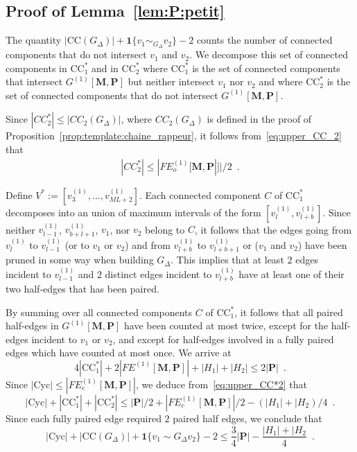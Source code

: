 \documentclass{article}
\begin{document}
\subsection{Proof of Lemma~\ref{lem:P:petit}}


The quantity $|\mathrm{CC}(G_{\Delta})|+ \mathbf{1}\{v_1\sim_{G_{\Delta}} v_2\} -2$ counts the number of connected components that do not intersect $v_1$ and $v_2$. We decompose this set of connected components in $\mathrm{CC}^*_{1}$ and in  $\mathrm{CC}^*_2$ where $\mathrm{CC}^*_{1}$ is the set of connected components that intersect $G^{(1)}[\mathbf{M},\mathbf{P}]$ but neither intersect  $v_1$ nor $v_2$ and where $\mathrm{CC}^*_2$ is the set of connected components that do not intersect $G^{(1)}[\mathbf{M},\mathbf{P}]$. 

Since $|CC^*_2|\leq |CC_2(G_{\Delta})|$, where $CC_2(G_{\Delta})$ is defined in the proof of Proposition~\ref{prop:template:chaine_rappeur}, it follows from~\eqref{eq:upper_CC_2} that  
\begin{align}\label{eq:upper_CC*2}
|CC^*_2|\leq |FE^{(1)}_o[\mathbf{M},\mathbf{P}|]|/2\enspace .
\end{align}

Define $V^*:=[v_3^{(1)},\ldots, v_{ML+2}^{(1)}]$. Each connected component $C$ of  $\mathrm{CC}^*_{1}$ decomposes into an union of maximum intervals of the form $[v^{(1)}_l, v^{(1)}_{l+b}]$. Since neither $v_{l-1}^{(1)}$, $v_{b+l+1}^{(1)}$, $v_1$, nor $v_2$ belong to $C$, it follows that the edges going from $v_{l}^{(1)}$ to $v^{(1)}_{l-1}$ (or to $v_1$ or $v_2$) and from $v^{(1)}_{l+b}$ to $v^{(1)}_{l+b+1}$ or ($v_1$ and $v_2$) have been pruned in some way when building $G_{\Delta}$. This implies that at least $2$ edges incident to $v_{l-1}^{(1)}$ and $2$ distinct edges incident to $v^{(1)}_{l+b}$ have at least one of their two half-edges that has been paired.  

By summing over all connected components $C$ of $\mathrm{CC}^*_{1}$, it follows that all paired half-edges in $G^{(1)}[\mathbf{M},\mathbf{P}]$ have been  counted at most twice, except for the half-edges incident to $v_1$ or $v_2$, and except for half-edges involved in a fully paired edges which have counted at most once. 
We arrive at  
\[
4 |\mathrm{CC}^*_1|+ 2 |FE^{(1)}[\mathbf{M},\mathbf{P}]|+ |H_1|+|H_2| \leq 2|\mathbf{P}|\enspace . 
\]
Since $|\mathrm{Cyc}|\leq |FE^{(1)}_{c}[\mathbf{M},\mathbf{P}]|$, we deduce from~\eqref{eq:upper_CC*2}  that 
\[
|\mathrm{Cyc}| +  |\mathrm{CC}^*_1|+  |\mathrm{CC}^*_2| \leq |\mathbf{P}|/2 + |FE^{(1)}_{c}[\mathbf{M},\mathbf{P}]|/2 - (|H_1|+|H_2)/4\enspace . 
\]
Since each fully paired edge required $2$ paired half edges, we conclude that 
\[
|\mathrm{Cyc}| + |\mathrm{CC}(G_{\Delta})|+ \mathbf{1}\{v_1\sim G_{\Delta} v_2\} -2 \leq \frac{3}{4}|\mathbf{P}| - \frac{|H_1|+|H_2}{4}\enspace . 
\]
\end{document}
